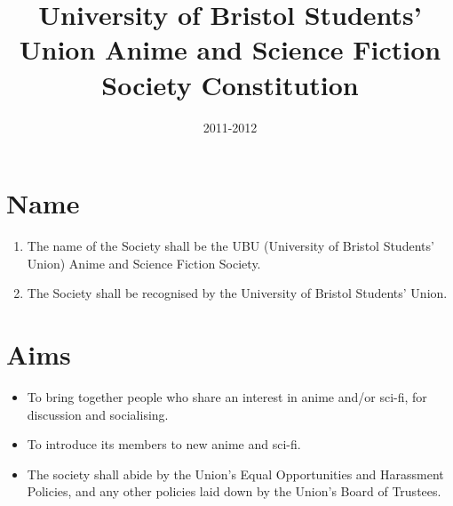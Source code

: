 \documentclass[a4paper,10pt]{article}
\title{University of Bristol Students’ Union Anime and Science Fiction Society Constitution}
\date{2011-2012}
\begin{document}
\newcommand{\proposedadd}[1]{\textcolor{green}{#1}}
\newcommand{\proposeddel}[1]{\textcolor{red}{#1}}

\maketitle

\section{Name}
\begin{enumerate}
  \item The name of the Society shall be the UBU (University of Bristol Students’ Union) Anime and Science Fiction Society.
  \item The Society shall be recognised by the University of Bristol Students’ Union.
\end{enumerate}

\section{Aims}
\begin{itemize}
  \item To bring together people who share an interest in anime and/or sci-fi, for discussion and socialising.
  \item To introduce its members to new anime and sci-fi.
  \item The society shall abide by the Union’s Equal Opportunities and Harassment Policies, and any other policies laid down by the Union’s Board of Trustees.
\end{itemize}
\end{document}
